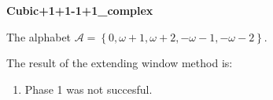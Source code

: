 \begin{exmp}
\textbf{ Cubic+1+1-1+1\_complex }

\label{ex:Cubic+1+1-1+1complex}

The alphabet $\mathcal{A} =\left\{0, \omega + 1, \omega + 2, -\omega - 1, -\omega - 2\right\}$.

The result of the extending window method is:
\begin{enumerate}
    \item Phase 1 was not succesful. 

\end{enumerate}
\end{exmp}
